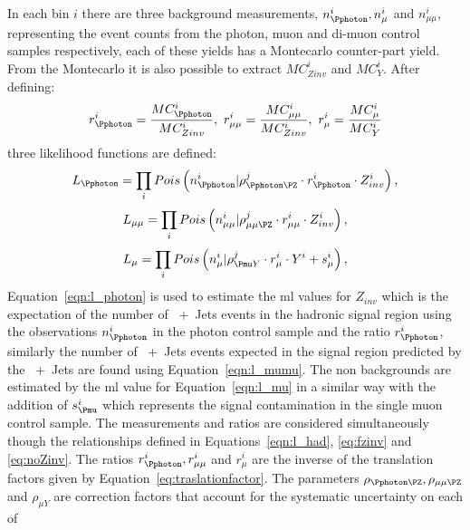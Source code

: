 In each \HT bin $i$ there are three background measurements, $n_{\Pphoton}^{i}, 
n^{i}_{\mu}$ and $n^{i}_{\mu\mu}$, representing the event counts from the 
photon, muon and di-muon control samples respectively, each of these yields has 
a Montecarlo counter-part yield. From the Montecarlo it is also possible to 
extract $MC^{i}_{Zinv}$ and $MC^{i}_{Y}$. After defining:
\begin{equation}
  r^{i}_{\Pphoton} = \frac{MC^{i}_{\Pphoton}}{MC^{i}_{Zinv}},~ r^{i}_{\mu\mu} = \frac{MC^{i}_{\mu\mu}}{MC^{i}_{Zinv}},~r^{i}_{\mu} = \frac{MC^{i}_{\mu}}{MC^{i}_{Y}}
\end{equation}
three likelihood functions are defined:
\begin{equation}
  L_{\Pphoton} = \prod_{i}Pois\left(n^{i}_\Pphoton|\rho^{j}_{\Pphoton\PZ} \cdot  r^{i}_{\Pphoton}\cdot  Z_{inv}^{i} \right),
  \label{eqn:l_photon}
\end{equation}
\begin{equation}
  L_{\mu\mu} = \prod_{i}Pois\left(n^{i}_{\mu\mu}|\rho^{j}_{\mu\mu\PZ}\cdot r^{i}_{\mu\mu}\cdot  Z^{i}_{inv}\right),
  \label{eqn:l_mumu}
\end{equation}
\begin{equation}
  L_{\mu} = \prod_{i}Pois\left(n^{i}_{\mu}|\rho^{j}_{\Pmu Y}\cdot  r^{i}_{\mu}\cdot  Y^{i}+s^{i}_{\mu}\right),
  \label{eqn:l_mu}
\end{equation}
Equation~\eqref{eqn:l_photon} is used to estimate the \ac{ml} values for 
$Z_{inv}$ which is the expectation of the number of 
\HepProcess{\PZ\to\Pnu\Pnu}~+~Jets events in the hadronic signal region using 
the observations $n_{\Pphoton}^{i}$ in the photon control sample and the ratio 
$r^{i}_{\Pphoton}$, similarly the number of \HepProcess{\PZ\to\Pnu\Pnu}~+~Jets 
events expected in the signal region predicted by the 
\HepProcess{\PZ\to\Pmu\Pmu}~+~Jets are found using Equation~\eqref{eqn:l_mumu}. 
The non \HepProcess{\PZ\to\Pnu\Pnu} backgrounds are estimated by the \ac{ml} 
value for Equation~\eqref{eqn:l_mu} in a similar way with the addition of 
$s^{i}_{\Pmu}$ which represents the signal contamination in the single muon 
control sample. The measurements and ratios are considered simultaneously 
though the relationships defined in Equations~\eqref{eqn:l_had}, \eqref{eq:fzinv} and \eqref{eq:noZinv}.
The ratios $r^{i}_{\Pphoton}, r^{i}_{\mu\mu}$ and $r^{i}_{\mu}$ are the inverse 
of the translation factors given by Equation~\eqref{eq:traslationfactor}. The 
parameters $\rho_{\Pphoton\PZ}, \rho_{\mu\mu\PZ}$ and $\rho_{\mu Y}$ 
are correction factors that account for the systematic uncertainty on each of 
